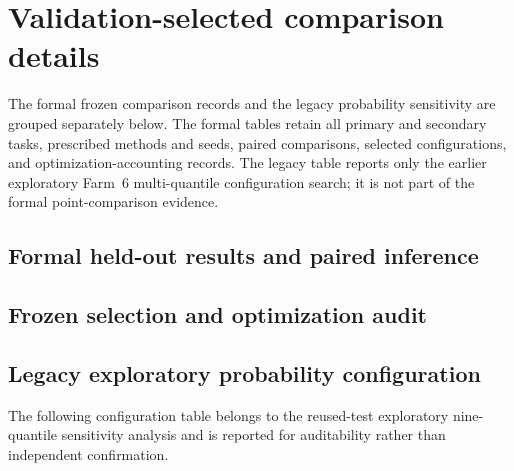 \section{Validation-selected comparison details}\label{app:selection_details}
{\color{blue}The formal frozen comparison records and the legacy probability sensitivity are grouped separately below. The formal tables retain all primary and secondary tasks, prescribed methods and seeds, paired comparisons, selected configurations, and optimization-accounting records. The legacy table reports only the earlier exploratory Farm~6 multi-quantile configuration search; it is not part of the formal point-comparison evidence.}

\subsection{Formal held-out results and paired inference}

\FloatBarrier


\subsection{Frozen selection and optimization audit}


\FloatBarrier

\subsection{Legacy exploratory probability configuration}
{\color{blue}The following configuration table belongs to the reused-test exploratory nine-quantile sensitivity analysis and is reported for auditability rather than independent confirmation.}

\FloatBarrier
